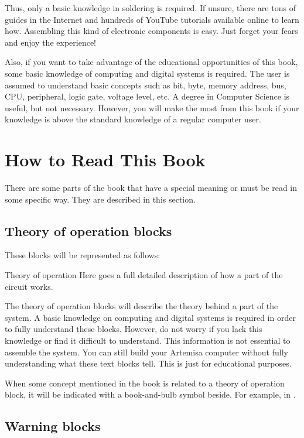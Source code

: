 Thus, only a basic knowledge in soldering is required. If unsure, there are tons of guides in the Internet and hundreds of YouTube tutorials available online to learn how. Assembling this kind of electronic components is easy. Just forget your fears and enjoy the experience!

Also, if you want to take advantage of the educational opportunities of this book, some basic knowledge of computing and digital systems is required. The user is assumed to understand basic concepts such as bit, byte, memory address, bus, CPU, peripheral, logic gate, voltage level, etc. A degree in Computer Science is useful, but not necessary. However, you will make the most from this book if your knowledge is above the standard knowledge of a regular computer user.

\section{How to Read This Book}

There are some parts of the book that have a special meaning or must be read in some specific way. They are described in this section. 

\subsection{Theory of operation blocks}

These blocks will be represented as follows:

\begin{theory}{Theory of operation}
	Here goes a full detailed description of how a part of the circuit works. 	
\end{theory}

The theory of operation blocks will describe the theory behind a part of the system. A basic knowledge on computing and digital systems is required in order to fully understand these blocks. However, do not worry if you lack this knowledge or find it difficult to understand. This information is not essential to assemble the system. You can still build your Artemisa computer without fully understanding what these text blocks tell. This is just for educational purposes.

When some concept mentioned in the book is related to a theory of operation block, it will be indicated with a book-and-bulb symbol beside. For example, in .

\subsection{Warning blocks}

